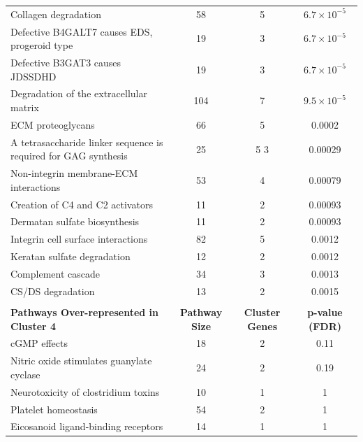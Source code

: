 \begin{table}[!Hp]
{\begin{tabular}{lccc}
  \rowcolor{Cluster_Orange!15}
  Collagen degradation &  58 &   5 & $6.7 \times 10^{-5}$ \\ 
  \rowcolor{Cluster_Orange!20}
  Defective B4GALT7 causes EDS, progeroid type &  19 &   3 & $6.7 \times 10^{-5}$ \\ 
  \rowcolor{Cluster_Orange!15}
  Defective B3GAT3 causes JDSSDHD &  19 &   3 & $6.7 \times 10^{-5}$ \\ 
  \rowcolor{Cluster_Orange!20}
  Degradation of the extracellular matrix & 104 &   7 & $9.5 \times 10^{-5}$ \\ 
  \rowcolor{Cluster_Orange!15}
  ECM proteoglycans &  66 &   5 & 0.0002 \\ 
  \rowcolor{Cluster_Orange!20}
  A tetrasaccharide linker sequence is required for GAG synthesis &  25 & 5 3 & 0.00029 \\ 
  \rowcolor{Cluster_Orange!15}
  Non-integrin membrane-ECM interactions &  53 &   4 & 0.00079 \\ 
  \rowcolor{Cluster_Orange!20}
  Creation of C4 and C2 activators &  11 &   2 & 0.00093 \\ 
  \rowcolor{Cluster_Orange!15}
  Dermatan sulfate biosynthesis &  11 &   2 & 0.00093 \\ 
  \rowcolor{Cluster_Orange!20}
  Integrin cell surface interactions &  82 &   5 & 0.0012 \\ 
  \rowcolor{Cluster_Orange!15}
  Keratan sulfate degradation &  12 &   2 & 0.0012 \\ 
  \rowcolor{Cluster_Orange!20}
  Complement cascade &  34 &   3 & 0.0013 \\ 
  \rowcolor{Cluster_Orange!15}
  CS/DS degradation &  13 &   2 & 0.0015 \\ 
  \hline
  \\ 
  \cellcolor{white} \large{\textbf{Pathways Over-represented in Cluster 4}} & \large{\textbf{Pathway Size}} & \large{\textbf{Cluster Genes}} & \large{\textbf{p-value (FDR)}} \\ %
  \hline
  \rowcolor{Cluster_Red!20}
  cGMP effects &  18 &   2 & 0.11 \\ 
  \rowcolor{Cluster_Red!15}
  Nitric oxide stimulates guanylate cyclase &  24 &   2 & 0.19 \\ 
  \rowcolor{Cluster_Red!20}
  Neurotoxicity of clostridium toxins &  10 &   1 &   1 \\ 
  \rowcolor{Cluster_Red!15}
  Platelet homeostasis &  54 &   2 &   1 \\ 
  \rowcolor{Cluster_Red!20}
  Eicosanoid ligand-binding receptors &  14 &   1 &   1 \\ 

\end{tabular}}
\end{table}
